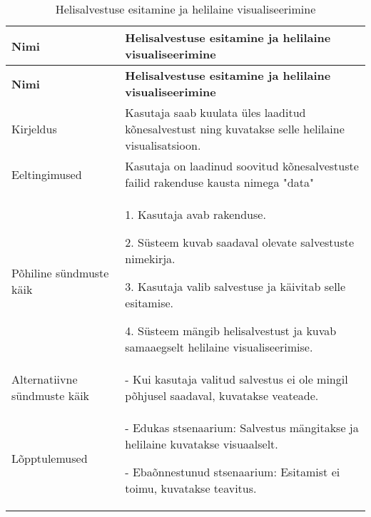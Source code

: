 \begin{longtable}{|p{2.5cm}|p{11cm}|}
    \caption{{Helisalvestuse esitamine ja helilaine visualiseerimine}}
    \label{tab:kasutusjuht5}\\ \hline
    \textbf{Nimi} &  \textbf{Helisalvestuse esitamine ja helilaine visualiseerimine}  \\
    \hline
    \endfirsthead
    \hline
    \textbf{Nimi} &  \textbf{Helisalvestuse esitamine ja helilaine visualiseerimine}  \\
    \hline
    \endhead
    \hline
    \endfoot
    \hline
    \endlastfoot
    Kirjeldus & Kasutaja saab kuulata üles laaditud kõnesalvestust ning kuvatakse selle helilaine visualisatsioon.\\ \hline
    Eeltingimused & Kasutaja on laadinud soovitud kõnesalvestuste failid rakenduse kausta nimega "data"\\ \hline
    Põhiline sündmuste käik & 
    1. Kasutaja avab rakenduse.
    
    2. Süsteem kuvab saadaval olevate salvestuste nimekirja.
    
    3. Kasutaja valib salvestuse ja käivitab selle esitamise.
    
    4. Süsteem mängib helisalvestust ja kuvab samaaegselt helilaine visualiseerimise.
    \\ \hline
    Alternatiivne sündmuste käik & 
    - Kui kasutaja valitud salvestus ei ole mingil põhjusel saadaval, kuvatakse veateade.
    \\ \hline
    Lõpptulemused & 
    - Edukas stsenaarium: Salvestus mängitakse ja helilaine kuvatakse visuaalselt.
    
    - Ebaõnnestunud stsenaarium: Esitamist ei toimu, kuvatakse teavitus.
    \\ \hline
\end{longtable}

